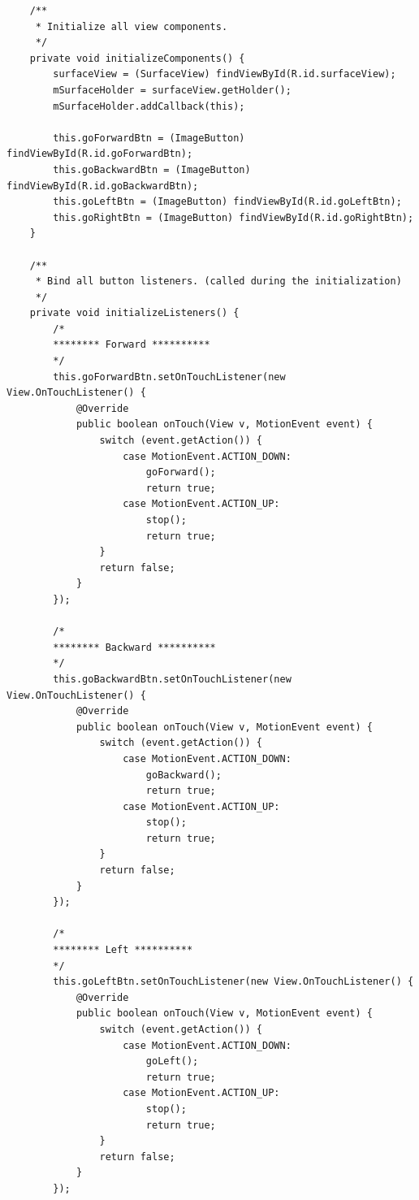 \documentclass[11pt]{article}
\begin{document}
\begin{lstlisting}
    /**
     * Initialize all view components.
     */
    private void initializeComponents() {
        surfaceView = (SurfaceView) findViewById(R.id.surfaceView);
        mSurfaceHolder = surfaceView.getHolder();
        mSurfaceHolder.addCallback(this);

        this.goForwardBtn = (ImageButton) findViewById(R.id.goForwardBtn);
        this.goBackwardBtn = (ImageButton) findViewById(R.id.goBackwardBtn);
        this.goLeftBtn = (ImageButton) findViewById(R.id.goLeftBtn);
        this.goRightBtn = (ImageButton) findViewById(R.id.goRightBtn);
    }

    /**
     * Bind all button listeners. (called during the initialization)
     */
    private void initializeListeners() {
        /*
        ******** Forward **********
        */
        this.goForwardBtn.setOnTouchListener(new View.OnTouchListener() {
            @Override
            public boolean onTouch(View v, MotionEvent event) {
                switch (event.getAction()) {
                    case MotionEvent.ACTION_DOWN:
                        goForward();
                        return true;
                    case MotionEvent.ACTION_UP:
                        stop();
                        return true;
                }
                return false;
            }
        });

        /*
        ******** Backward **********
        */
        this.goBackwardBtn.setOnTouchListener(new View.OnTouchListener() {
            @Override
            public boolean onTouch(View v, MotionEvent event) {
                switch (event.getAction()) {
                    case MotionEvent.ACTION_DOWN:
                        goBackward();
                        return true;
                    case MotionEvent.ACTION_UP:
                        stop();
                        return true;
                }
                return false;
            }
        });

        /*
        ******** Left **********
        */
        this.goLeftBtn.setOnTouchListener(new View.OnTouchListener() {
            @Override
            public boolean onTouch(View v, MotionEvent event) {
                switch (event.getAction()) {
                    case MotionEvent.ACTION_DOWN:
                        goLeft();
                        return true;
                    case MotionEvent.ACTION_UP:
                        stop();
                        return true;
                }
                return false;
            }
        });


\end{lstlisting}
\end{document}
